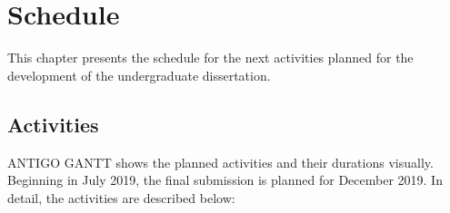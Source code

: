 \chapter{Schedule}
\label{ch.schedule}

This chapter presents the schedule for the next activities
planned for the development of the undergraduate dissertation.

\section{Activities}
\label{sec:gantt}






	ANTIGO GANTT shows the planned activities and their durations visually.
	Beginning in July 2019, the final submission is planned for December 2019.
	In detail, the activities are described below:

